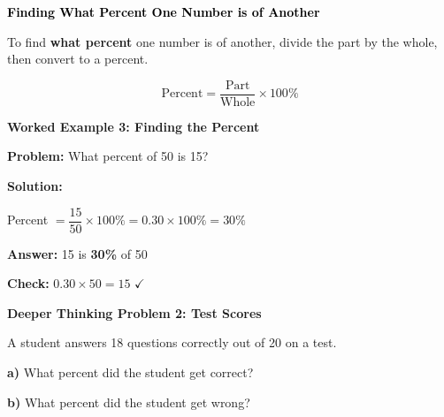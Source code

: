 \documentclass[12pt, letterpaper, fleqn]{article}
\begin{document}
\vspace{4mm}

\begin{tcolorbox}[colback=customteal!20]
\large\textcolor{black}{\textbf{Finding What Percent One Number is of Another}}
\end{tcolorbox}

\noindent
To find \textbf{what percent} one number is of another, divide the part by the whole, then convert to a percent.

$$\text{Percent} = \dfrac{\text{Part}}{\text{Whole}} \times 100\%$$

\vspace{3mm}

\begin{tcolorbox}[colback=white, colframe=black!25, boxrule=0.6pt, arc=4mm, left=6mm, right=6mm, top=5mm, bottom=5mm]

\textbf{Worked Example 3: Finding the Percent}

\medskip

\textbf{Problem:} What percent of 50 is 15?

\medskip

\noindent
\textbf{Solution:}

\medskip

\noindent
Percent $= \dfrac{15}{50} \times 100\% = 0.30 \times 100\% = 30\%$

\medskip

\noindent
\textbf{Answer:} 15 is \textbf{30\%} of 50

\medskip

\noindent
\textbf{Check:} $0.30 \times 50 = 15$ $\checkmark$

\end{tcolorbox}

\vspace{4mm}

\begin{tcolorbox}[colback=white!15, colframe=black, boxrule=1.5pt, arc=4mm, left=6mm, right=6mm, top=5mm, bottom=5mm]

\textbf{Deeper Thinking Problem 2: Test Scores}

\medskip

\noindent
A student answers 18 questions correctly out of 20 on a test.

\noindent
\textbf{a)} What percent did the student get correct?

\vspace{3cm}

\noindent
\textbf{b)} What percent did the student get wrong?

\vspace{3cm}

\end{tcolorbox}
\end{document}
